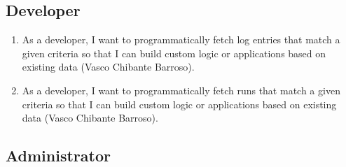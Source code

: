 \subsection{Developer}
\begin{enumerate}
  \item As a developer, I want to programmatically fetch log entries that match a given criteria so that I can build custom logic or applications based on existing data (Vasco Chibante Barroso). 
  \item As a developer, I want to programmatically fetch runs that match a given criteria so that I can build custom logic or applications based on existing data (Vasco Chibante Barroso). 
\end{enumerate}

\subsection{Administrator}
